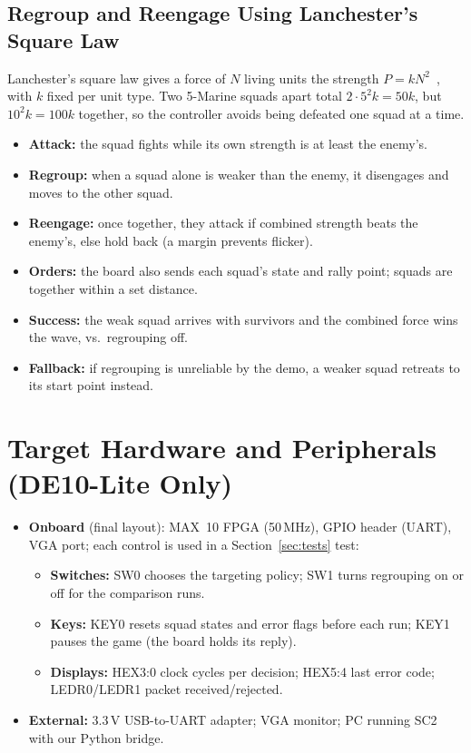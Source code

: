 \documentclass[10pt]{article}
\begin{document}
\subsection{Regroup and Reengage Using Lanchester's Square Law}\label{sec:lanchester}
{\small
Lanchester's square law gives a force of $N$ living units the strength $P = kN^2$~\cite{stanescu}, with $k$ fixed per unit type. Two 5-Marine squads apart total $2\cdot 5^2k = 50k$, but $10^2k = 100k$ together, so the controller avoids being defeated one squad at a time.
\begin{itemize}
\item \textbf{Attack:} the squad fights while its own strength is at least the enemy's.
\item \textbf{Regroup:} when a squad alone is weaker than the enemy, it disengages and moves to the other squad.
\item \textbf{Reengage:} once together, they attack if combined strength beats the enemy's, else hold back (a margin prevents flicker).
\item \textbf{Orders:} the board also sends each squad's state and rally point; squads are together within a set distance.
\item \textbf{Success:} the weak squad arrives with survivors and the combined force wins the wave, vs.\ regrouping off.
\item \textbf{Fallback:} if regrouping is unreliable by the demo, a weaker squad retreats to its start point instead.
\end{itemize}
}

\section{Target Hardware and Peripherals (DE10-Lite Only)}
{\small
\begin{itemize}
\item \textbf{Onboard} (final layout): MAX~10 FPGA (50\,MHz), GPIO header (UART), VGA port; each control is used in a Section~\ref{sec:tests} test:
  \begin{itemize}
  \item \textbf{Switches:} SW0 chooses the targeting policy; SW1 turns regrouping on or off for the comparison runs.
  \item \textbf{Keys:} KEY0 resets squad states and error flags before each run; KEY1 pauses the game (the board holds its reply).
  \item \textbf{Displays:} HEX3:0 clock cycles per decision; HEX5:4 last error code; LEDR0/LEDR1 packet received/rejected.
  \end{itemize}
\item \textbf{External:} 3.3\,V USB-to-UART adapter; VGA monitor; PC running SC2 with our Python bridge.
\end{itemize}
}
\end{document}
